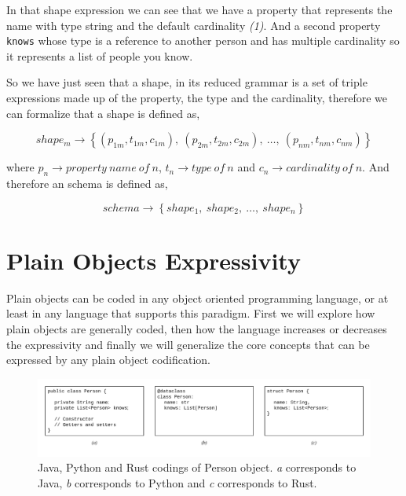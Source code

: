 In that shape expression we can see that we have a property that represents the name with type string and the default cardinality \textit{(1)}.
And a second property \texttt{knows} whose type is a reference to another person and has multiple cardinality so it represents a list of people you know.

So we have just seen that a shape, in its reduced grammar is a set of triple expressions made up of the property, the type and the cardinality,
therefore we can formalize that a shape is defined as,

\begin{equation}\label{eq:shape-formalization}
shape_m \rightarrow \left \{ (p_{1m},t_{1m},c_{1m}),\ (p_{2m},t_{2m},c_{2m}),\ \dots,\ (p_{nm},t_{nm},c_{nm}) \right \}
\end{equation}

where $p_n \rightarrow property\ name\ of\ n$, $t_n \rightarrow type\ of\ n$ and $c_n \rightarrow cardinality\ of\ n$.
And therefore an schema is defined as,

\begin{equation}\label{eq:schema-formalization}
schema \rightarrow \left \{ shape_1,\ shape_2,\ \dots,\ shape_n \right \}
\end{equation}



\section{Plain Objects Expressivity}
Plain objects can be coded in any object oriented programming language, or at least in
any language that supports this paradigm. First we will explore how plain objects are 
generally coded, then how the language increases or decreases the expressivity and
finally we will generalize the core concepts that can be expressed by any plain object
codification.

\begin{figure}
    \includegraphics[width=\textwidth]{images/codings-exmaple.png}
    \centering
    \caption[Java, Python and Rust codings of Person object.]{Java, Python and Rust codings of Person object. 
    \textit{a} corresponds to Java, \textit{b} corresponds to Python and \textit{c} corresponds to Rust.}
    \label{fig:person-codings}
\end{figure}


